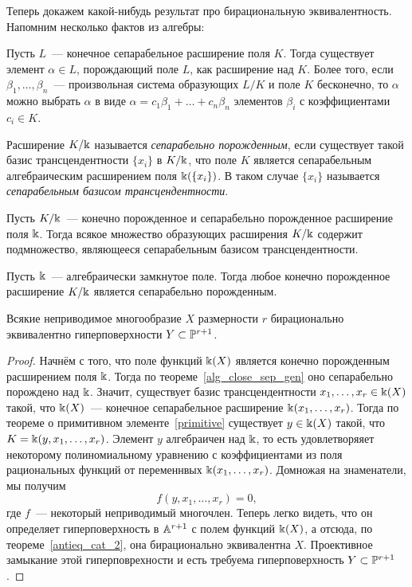 	 Теперь докажем какой-нибудь результат про бирациональную эквивалентность. Напомним несколько фактов из алгебры: 

	 \begin{theorem}\label{primitive} 
	 	Пусть $L$~--- конечное сепарабельное расширение поля $K$. Тогда существует элемент $\alpha \in L$, порождающий поле $L$, как расширение над $K$. Более того, если $\beta_1, \ldots, \beta_n$~--- произвольная система образующих $L/K$ и  поле $K$ бесконечно, то $\alpha$ можно выбрать $\alpha$ в виде $\alpha = c_1 \beta_1 + \ldots + c_n\beta_n$ элементов $\beta_i$ с коэффициентами $c_i \in K$.
	 \end{theorem}

	 \begin{definition} 
	 	Расширение $K/\bk$ называется \emph{сепарабельно порожденным}, если существует такой базис трансцендентности $\{ x_i \}$ в $K/\bk$, что поле $K$ является сепарабельным алгебраическим расширением поля $\bk(\{ x_i \})$. В таком случае $\{ x_i \}$ называется \emph{сепарабельным базисом трансцендентности}.
	 \end{definition}

	 \begin{theorem} 
	 	Пусть $K/\bk$~--- конечно порожденное и сепарабельно порожденное расширение поля $\bk$. Тогда всякое множество образующих расширения $K/\bk$ содержит подмножество, являющееся сепарабельным базисом трансцендентности. 
	 \end{theorem}

	 \begin{theorem}\label{alg_close_sep_gen} 
	 	Пусть $\bk$~--- ал{}гебраически замкнутое поле. Тогда любое конечно порожденное расширение $K/\bk$ является сепарабельно порожденным. 
	 \end{theorem}


	 \begin{statement} 
	 	Всякие неприводимое многообразие $X$ размерности $r$ бирационально эквивалентно гиперповерхности $Y \subset \PP^{r + 1}$. 
	 \end{statement}
	 \begin{proof}
	 	Начнём с того, что поле функций $\bk(X)$ является конечно порожденным расширением поля $\bk$. Тогда по теореме~\ref{alg_close_sep_gen} оно сепарабельно порождено над $\bk$. Значит, существует базис трансцендентности $x_1, \ldots, x_r \in \bk(X)$ такой, что $\bk(X)$~--- конечное сепарабельное расширение $\bk(x_1, \ldots, x_{r})$. Тогда по теореме о примитивном элементе~\ref{primitive} существует $y \in \bk(X)$ такой, что $K = \bk(y, x_1, \ldots, x_r)$. Элемент $y$ алгебраичен над $\bk$, то есть удовлетворяяет некоторому полиномиальному уравнению с коэффициентами из поля рациональных функций от переменнвых $\bk(x_1, \ldots, x_r)$. Домножая на знаменатели, мы получим 
	 	\[
	 		f(y, x_1, \ldots, x_r) = 0,
	 	\]
	 	где $f$~--- некоторый неприводимый многочлен. Теперь легко видеть, что он определяет гиперповерхность в $\AA^{r + 1}$ с полем функций $\bk(X)$, а отсюда, по теореме~\ref{antieq_cat_2}, она бирационально эквивалентна $X$. Проективное замыкание этой гиперповрехности и есть требуема гиперповерхность $Y \subset \PP^{r + 1}$. 
	 \end{proof}

